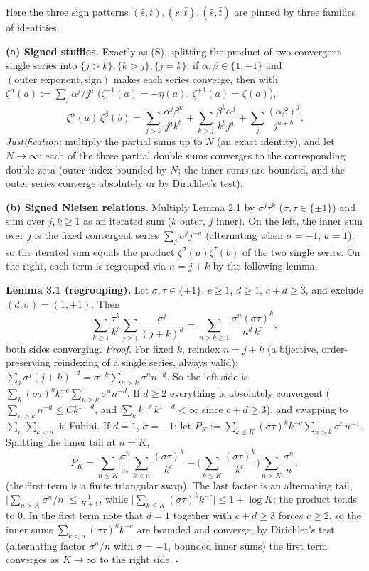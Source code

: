 \documentclass[11pt]{article}
\theoremstyle{remark}
\begin{document}
Here the three sign patterns $(\bar s,t),(s,\bar t),(\bar s,\bar t)$ are pinned by three families of
identities.

\textbf{(a) Signed stuffles.} Exactly as (S), splitting the product of two convergent single series into
$\{j>k\},\{k>j\},\{j=k\}$: if $\alpha,\beta\in\{1,-1\}$ and $(\text{outer exponent},\text{sign})$
makes each series converge, then with $\zeta^{\alpha}(a):=\sum_j\alpha^j/j^a$
($\zeta^{-1}(a)=-\eta(a)$, $\zeta^{+1}(a)=\zeta(a)$),
\[
\zeta^{\alpha}(a)\,\zeta^{\beta}(b)
=\sum_{j>k}\frac{\alpha^j\beta^k}{j^ak^b}+\sum_{k>j}\frac{\beta^k\alpha^j}{k^bj^a}
+\sum_{j}\frac{(\alpha\beta)^j}{j^{a+b}}.
\]
\textit{Justification:} multiply the partial sums up to $N$ (an exact identity), and let $N\to\infty$; each
of the three partial double sums converges to the corresponding double zeta (outer index bounded by
$N$; the inner sums are bounded, and the outer series converge absolutely or by Dirichlet's test).

\textbf{(b) Signed Nielsen relations.} Multiply Lemma 2.1 by $\sigma^j\tau^k$ ($\sigma,\tau\in\{\pm1\}$)
and sum over $j,k\ge1$ as an iterated sum ($k$ outer, $j$ inner). On the left, the inner sum over
$j$ is the fixed convergent series $\sum_j\sigma^j j^{-a}$ (alternating when $\sigma=-1$, $a=1$),
so the iterated sum equals the product $\zeta^{\sigma}(a)\zeta^{\tau}(b)$ of the two single series.
On the right, each term is regrouped via $n=j+k$ by the following lemma.

\textbf{Lemma 3.1 (regrouping).} Let $\sigma,\tau\in\{\pm1\}$, $c\ge1$, $d\ge1$, $c+d\ge3$, and exclude
$(d,\sigma)=(1,+1)$. Then
\[
\sum_{k\ge1}\frac{\tau^k}{k^{c}}\sum_{j\ge1}\frac{\sigma^j}{(j+k)^{d}}
=\sum_{n>k\ge1}\frac{\sigma^{n}(\sigma\tau)^{k}}{n^{d}\,k^{c}},
\]
both sides converging.
\textit{Proof.} For fixed $k$, reindex $n=j+k$ (a bijective, order-preserving reindexing of a single
series, always valid): $\sum_j\sigma^j(j+k)^{-d}=\sigma^{-k}\sum_{n>k}\sigma^n n^{-d}$. So the left
side is $\sum_k(\sigma\tau)^k k^{-c}\sum_{n>k}\sigma^n n^{-d}$. If $d\ge2$ everything is absolutely
convergent ($\sum_{n>k}n^{-d}\le Ck^{1-d}$, and $\sum_k k^{-c}\,k^{1-d}<\infty$ since $c+d\ge3$), and
swapping to $\sum_n\sum_{k<n}$ is Fubini. If $d=1$, $\sigma=-1$: let
$P_K:=\sum_{k\le K}(\sigma\tau)^kk^{-c}\sum_{n>k}\sigma^nn^{-1}$. Splitting the inner tail at $n=K$,
\[
P_K=\sum_{n\le K}\frac{\sigma^n}{n}\sum_{k<n}\frac{(\sigma\tau)^k}{k^c}
+\Big(\sum_{k\le K}\frac{(\sigma\tau)^k}{k^c}\Big)\sum_{n>K}\frac{\sigma^n}{n},
\]
(the first term is a finite triangular swap). The last factor is an alternating tail,
$\big|\sum_{n>K}\sigma^n/n\big|\le\frac1{K+1}$, while $\big|\sum_{k\le K}(\sigma\tau)^kk^{-c}\big|\le
1+\log K$; the product tends to $0$. In the first term note that $d=1$ together with $c+d\ge3$
forces $c\ge2$, so the inner sums $\sum_{k<n}(\sigma\tau)^kk^{-c}$ are bounded and converge; by
Dirichlet's test (alternating factor $\sigma^n/n$ with $\sigma=-1$, bounded inner sums) the first
term converges as $K\to\infty$ to the right side. $\square$
\end{document}
